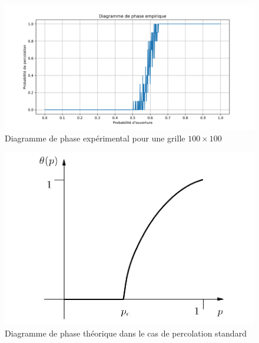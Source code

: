\documentclass[11pt,a4paper]{article}
\begin{document}
\begin{figure}[H]
    \centering
    \includegraphics[width=0.5 \textwidth]{./Pictures/percolation_probability.png}
    \caption{Diagramme de phase expérimental pour une grille $100\times 100$}
    \label{fig:phase}
\end{figure}


\begin{figure}[H]
    \centering
    \includegraphics[width=0.4 \textwidth]{./Pictures/ph_th.png}
    \caption{Diagramme de phase théorique dans le cas de percolation standard \cite{grimmett}}
    \label{fig:phase_th}
\end{figure}
\end{document}

